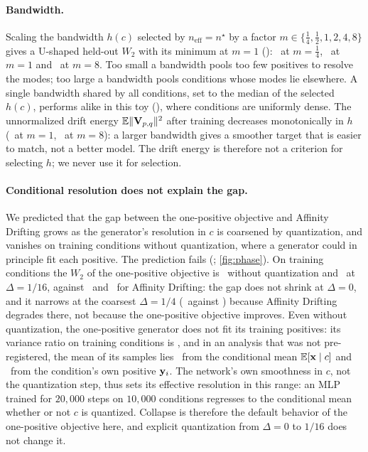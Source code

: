 \paragraph{Bandwidth.} Scaling the bandwidth $h(c)$ selected by $n_\mathrm{eff}=n^\star$ by a factor
$m\in\{\tfrac14,\tfrac12,1,2,4,8\}$ gives a U-shaped held-out $W_2$ with its minimum at $m=1$ (\VerdictEOneSix):
\EOneSixQuarterW\ at $m=\tfrac14$, \EOneSixOneW\ at $m=1$ and \EOneSixEightW\ at $m=8$. Too small a bandwidth pools too
few positives to resolve the modes; too large a bandwidth pools conditions whose modes lie elsewhere. A single
bandwidth shared by all conditions, set to the median of the selected $h(c)$, performs alike in this toy
(\EOneSixFixedW), where conditions are uniformly dense. The unnormalized drift energy
$\mathbb E\lVert\mathbf{V}_{p,q}\rVert^2$ after training decreases monotonically in $h$ (\EOneSixOneEnergy\ at $m=1$,
\EOneSixEightEnergy\ at $m=8$): a larger bandwidth gives a smoother target that is easier to match, not a better
model. The drift energy is therefore not a criterion for selecting $h$; we never use it for selection.

\paragraph{Conditional resolution does not explain the gap.} We predicted that the gap between the one-positive
objective and Affinity Drifting grows as the generator's resolution in $c$ is coarsened by quantization, and vanishes
on training conditions without quantization, where a generator could in principle fit each positive. The prediction
fails (\VerdictEOneFour; \cref{fig:phase}). On training conditions the $W_2$ of the one-positive objective is
\EOneFourZeroOneW\ without quantization and \EOneFourSixteenOneW\ at $\Delta=1/16$, against \EOneFourZeroAffW\ and
\EOneFourSixteenAffW\ for Affinity Drifting: the gap does not shrink at $\Delta=0$, and it narrows at the coarsest
$\Delta=1/4$ (\EOneFourFourOneW\ against \EOneFourFourAffW) because Affinity Drifting degrades there, not because the
one-positive objective improves. Even without quantization, the one-positive generator does not fit its training
positives: its variance ratio on training conditions is \EOneFourZeroOneTVR, and in an analysis that was not
pre-registered, the mean of its samples lies \RefOneToMean\ from the conditional mean $\mathbb E[\mathbf{x}\mid c]$ and
\RefOneToOwn\ from the condition's own positive $\mathbf{y}_i$.
The network's own smoothness in $c$, not the quantization step, thus sets its effective resolution in this range: an
MLP trained for $20{,}000$ steps on $10{,}000$ conditions regresses to the conditional mean whether or not $c$ is
quantized. Collapse is therefore the default behavior of the one-positive objective here, and explicit quantization
from $\Delta=0$ to $1/16$ does not change it.

